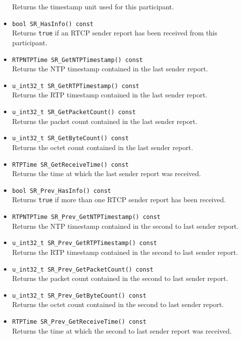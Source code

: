 \documentclass[12pt,a4paper]{article}
\begin{document}
\begin{itemize}
						Returns the timestamp unit used for this participant.
					\item {\tt bool SR\_HasInfo() const}\\
						Returns {\tt true} if an RTCP sender report has been received from this participant.
					\item {\tt RTPNTPTime SR\_GetNTPTimestamp() const}\\
						Returns the NTP timestamp contained in the last sender report.
					\item {\tt u\_int32\_t SR\_GetRTPTimestamp() const}\\
						Returns the RTP timestamp contained in the last sender report.
					\item {\tt u\_int32\_t SR\_GetPacketCount() const}\\
						Returns the packet count contained in the last sender report.
					\item {\tt u\_int32\_t SR\_GetByteCount() const}\\
						Returns the octet count contained in the last sender report.
					\item {\tt RTPTime SR\_GetReceiveTime() const}\\
						Returns the time at which the last sender report was received.
					\item {\tt bool SR\_Prev\_HasInfo() const}\\
						Returns {\tt true} if more than one RTCP sender report has been received.
					\item {\tt RTPNTPTime SR\_Prev\_GetNTPTimestamp() const}\\
						Returns the NTP timestamp contained in the second to last sender report.
					\item {\tt u\_int32\_t SR\_Prev\_GetRTPTimestamp() const}\\
						Returns the RTP timestamp contained in the second to last sender report.
					\item {\tt u\_int32\_t SR\_Prev\_GetPacketCount() const}\\
						Returns the packet count contained in the second to last sender report.
					\item {\tt u\_int32\_t SR\_Prev\_GetByteCount() const}\\
						Returns the octet count contained in the second to last sender report.
					\item {\tt RTPTime SR\_Prev\_GetReceiveTime() const}\\
						Returns the time at which the second to last sender report was received.

\end{itemize}
\end{document}
